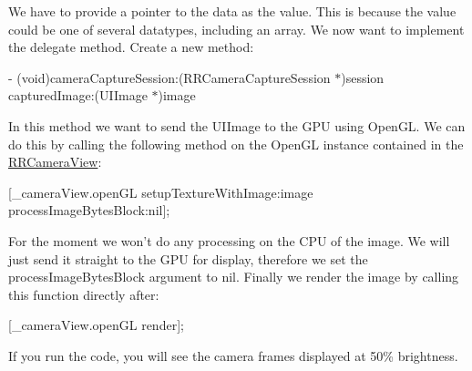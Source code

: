 We have to provide a pointer to the data as the value. This is because the value could be one of several datatypes, including an array. We now want to implement the delegate method. Create a new method\-:

{\ttfamily -\/ (void)camera\-Capture\-Session\-:(\-R\-R\-Camera\-Capture\-Session $\ast$)session captured\-Image\-:(\-U\-I\-Image $\ast$)image}

In this method we want to send the U\-I\-Image to the G\-P\-U using Open\-G\-L. We can do this by calling the following method on the Open\-G\-L instance contained in the \hyperlink{interface_r_r_camera_view}{R\-R\-Camera\-View}\-:

{\ttfamily \mbox{[}\-\_\-camera\-View.\-open\-G\-L setup\-Texture\-With\-Image\-:image process\-Image\-Bytes\-Block\-:nil\mbox{]};}

For the moment we won't do any processing on the C\-P\-U of the image. We will just send it straight to the G\-P\-U for display, therefore we set the {\ttfamily process\-Image\-Bytes\-Block} argument to {\ttfamily nil}. Finally we render the image by calling this function directly after\-:

{\ttfamily \mbox{[}\-\_\-camera\-View.\-open\-G\-L render\mbox{]};}

If you run the code, you will see the camera frames displayed at 50\% brightness. 
